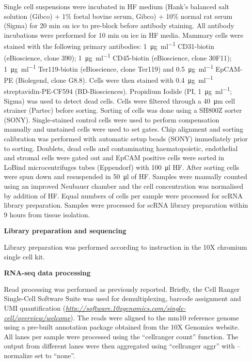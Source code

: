\documentclass[titlepage, 12pt, oneside]{amsart}
\begin{document}
Single cell suspensions were incubated in HF medium (Hank's balanced salt solution (Gibco) + 1\% foetal bovine serum, Gibco) + 10\% normal rat serum (Sigma) for 20 min on ice to pre-block before antibody staining.
All antibody incubations were performed for 10 min on ice in HF media.
Mammary cells were stained with the following primary antibodies: \SI{1}{\micro\gram\per\milli\litre} CD31-biotin (eBioscience, clone 390); \SI{1}{\micro\gram\per\milli\litre} CD45-biotin (eBioscience, clone 30F11); \SI{1}{\micro\gram\per\milli\litre} Ter119-biotin (eBioscience, clone Ter119) and \SI{0.5}{\micro\gram\per\milli\litre} EpCAM-PE (Biolegend, clone G8.8).
Cells were then stained with \SI{0.4}{\micro\gram\per\milli\litre} streptavidin-PE-CF594 (BD-Biosciences).
Propidium Iodide (PI, \SI{1}{\micro\gram\per\milli\litre}; Sigma) was used to detect dead cells.
Cells were filtered through a \SI{40}{\micro\meter} cell strainer (Partec) before sorting.
Sorting of cells was done using a SH800Z sorter (SONY).
Single-stained control cells were used to perform compensation manually and unstained cells were used to set gates.
Chip alignment and sorting calibration was performed with automatic setup beads (SONY) immediately prior to sorting.
Doublets, dead cells and contaminating haematopoietic, endothelial and stromal cells were gated out and EpCAM positive cells were sorted in LoBind\textsuperscript{\textregistered} microcentrifuges tubes (Eppendorf) with \SI{100}{\micro\litre} HF.
After sorting cells were spun down and resuspended in \SI{50}{\micro\litre} of HF. 
Samples were manually counted using an improved Neubauer chamber and the cell concentration was normalised by addition of HF.
Equal numbers of cells per sample were processed for scRNA library preparation.
Samples were processed for scRNA library preparation within 9 hours from tissue isolation.

\textbf{Library preparation and sequencing}

Library preparation was performed according to instruction in the 10X chromium single cell kit.

\textbf{RNA-seq data processing }

Read processing was performed as previously reported\autocite{Zheng2017}.
Briefly, the Cell Ranger Single-Cell Software Suite was used for demultiplexing, barcode assignment and UMI quantification (\href{http://software.10xgenomics.com/single-cell/overview/welcome}{\textit{http://software.10xgenomics.com/single-cell/overview/welcome}}).
The reads were aligned to the mm10 reference genome using a pre-built annotation package obtained from the 10X Genomics website.
All lanes per sample were processed using the ``cellranger count'' function.
The output from different lanes were then aggregated using ``cellranger aggr'' with --normalize set to ``none''.
\end{document}
